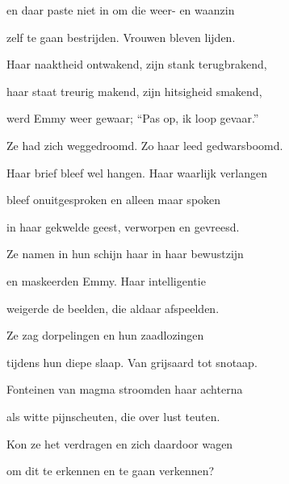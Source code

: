 en daar paste niet in
om die weer- en waanzin

zelf te gaan bestrijden.
Vrouwen bleven lijden.

Haar naaktheid ontwakend,
zijn stank terugbrakend,

haar staat treurig makend,
zijn hitsigheid smakend,

werd Emmy weer gewaar;
“Pas op, ik loop gevaar.”

Ze had zich weggedroomd.
Zo haar leed gedwarsboomd.

Haar brief bleef wel hangen.
Haar waarlijk verlangen

bleef onuitgesproken
en alleen maar spoken

in haar gekwelde geest,
verworpen en gevreesd.

Ze namen in hun schijn
haar in haar bewustzijn

en maskeerden Emmy.
Haar intelligentie

weigerde de beelden,
die aldaar afspeelden.

Ze zag dorpelingen
en hun zaadlozingen

tijdens hun diepe slaap.
Van grijsaard tot snotaap.

Fonteinen van magma
stroomden haar achterna

als witte pijnscheuten,
die over lust teuten.

Kon ze het verdragen
en zich daardoor wagen

om dit te erkennen
en te gaan verkennen?
